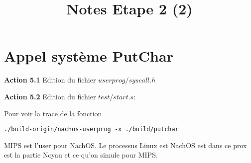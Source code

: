 \documentclass[a4paper,10pt]{article}
\title{Notes Etape 2 (2)}
\author{}
\begin{document}
\maketitle

\section{Appel système PutChar}

\textbf{Action 5.1} Edition du fichier $userprog/syscall.h$

\textbf{Action 5.2} Edition du fichier $test/start.s$:

Pour voir la trace de la fonction
\begin{lstlisting}
./build-origin/nachos-userprog -x ./build/putchar
\end{lstlisting}

MIPS est l'user pour NachOS.
Le processus Linux est NachOS est dans ce prox est la partie Noyau et ce
qu'on simule pour MIPS.
\end{document}

